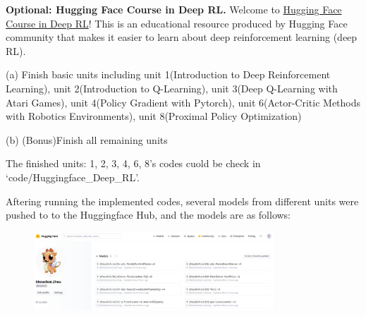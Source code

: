 \begin{homeworkProblem}

\textbf{Optional: Hugging Face Course in Deep RL.} Welcome to \href{https://huggingface.co/learn/deep-rl-course/unit0/introduction}{Hugging Face Course in Deep RL}! This is an educational resource produced by Hugging Face community that makes it easier to learn about deep reinforcement learning (deep RL).

(a) Finish basic units including unit 1(Introduction to Deep Reinforcement Learning), unit 2(Introduction to Q-Learning), unit 3(Deep Q-Learning with Atari Games), unit 4(Policy Gradient with Pytorch), unit 6(Actor-Critic Methods with Robotics Environments), unit 8(Proximal Policy Optimization)

(b) (Bonus)Finish all remaining units

\solution

The finished units: 1, 2, 3, 4, 6, 8's codes cuold be check in `code/Huggingface\_Deep\_RL'.

Aftering running the implemented codes, several models from different units were pushed to to the Huggingface Hub, and the models are as follows:
\begin{figure}[h]
    \centering
    \includegraphics[width=0.8\textwidth]{../Img/Huggingface_DRL/models.png}
\end{figure}


\end{homeworkProblem}
